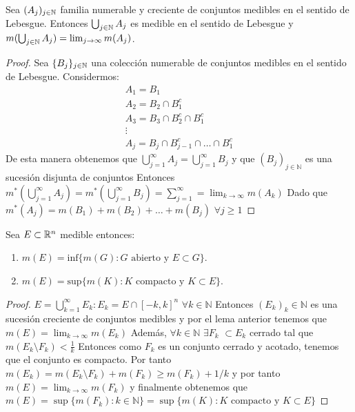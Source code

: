 \begin{lema}
    Sea $(A_j)_{j \in \mathbb{N}}$ familia numerable y creciente de conjuntos medibles en el sentido de Lebesgue. Entonces $\bigcup_{j \in \mathbb{N}} A_j$ es medible en el sentido de Lebesgue y $m(\bigcup_{j \in \mathbb{N}} A_j) = \lim_{j \to \infty} m(A_j)$.
\end{lema}

\begin{proof}
    Sea $\{B_j\}_{j \in \mathbb{N}}$ una colección numerable de conjuntos medibles en el sentido de Lebesgue. Considermos:
    \[\begin{matrix}
            A_1 = B_1                       \\
            A_2 = B_2 \cap B_1^c            \\
            A_3 = B_3 \cap B_2^c \cap B_1^c \\
            \vdots                          \\
            A_j = B_j \cap B_{j-1}^c \cap \ldots \cap B_1^c
        \end{matrix}\]
    De esta manera obtenemos que $\bigcup_{j = 1}^{\infty} A_j = \bigcup_{j =
            1}^{\infty} B_j$ y que $(B_j)_{j \in \mathbb{N}}$ es una sucesión disjunta de
    conjuntos Entonces $m^*(\bigcup_{j = 1}^{\infty}A_j) = m^*(\bigcup_{j =
            1}^{\infty}B_j) = \sum_{j = 1}^{\infty} = \lim_{k \to \infty} m(A_k)$ Dado que
    $m^*(A_j) = m(B_1) + m(B_2) + \ldots + m(B_j)$ $ \forall j \geq 1$
\end{proof}

\begin{corolario}
    Sea $E \subset \mathbb{R}^n$ medible entonces:
    \vspace{-0.5em}
    \begin{enumerate}
        \item $m(E) = \text{inf}\{m(G) : G \text{ abierto y } E \subset G\}$.
        \item $m(E) = \text{sup}\{m(K) : K \text{ compacto y } K \subset E\}$.
    \end{enumerate}
\end{corolario}

\begin{proof}
    $E = \bigcup_{k = 1}^{\infty} E_k : E_k = E \cap [-k, k]^n$ $\forall k \in \mathbb{N}$
    Entonces $(E_k)_k \in \mathbb{N}$ es una sucesión creciente de conjuntos medibles y por el lema anterior tenemos que $m(E) = \lim_{k \to \infty} m(E_k)$
    Además, $\forall k \in \mathbb{N}$ $\exists F_k$ $ \subset E_k$ cerrado tal que $m(E_k \setminus F_k) < \frac{1}{k}$
    Entonces como $F_k$ es un conjunto cerrado y acotado, tenemos que el conjunto es compacto.
    Por tanto $m(E_k) = m(E_k \setminus F_k) + m(F_k) \geq m(F_k) + 1/k$ y por tanto $m(E) = \lim_{k \to \infty} m(F_k)$ y finalmente obtenemos que
    $m(E) = \sup\{m(F_k) : k \in \mathbb{N} \} = \sup\{m(K) : K \text{ compacto y } K \subset E\}$
\end{proof}

